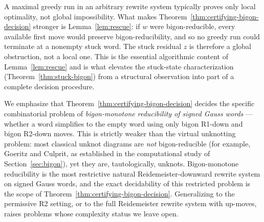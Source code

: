 \begin{remark}\label{rem:why-residual-is-cert}
A maximal greedy run in an arbitrary rewrite system typically proves
only local optimality, not global impossibility. What makes
Theorem~\ref{thm:certifying-bigon-decision} stronger is
Lemma~\ref{lem:rescue}: if $w$ were bigon-reducible, every available
first move would preserve bigon-reducibility, and so no greedy run
could terminate at a nonempty stuck word. The stuck residual $z$ is
therefore a global obstruction, not a local one. This is the essential
algorithmic content of Lemma~\ref{lem:rescue} and is what elevates
the stuck-state characterization
(Theorem~\ref{thm:stuck-bigon}) from a structural observation into
part of a complete decision procedure.
\end{remark}

\begin{remark}
\label{rem:scope-bigon-vs-unknotting}
We emphasize that Theorem~\ref{thm:certifying-bigon-decision} decides
the specific combinatorial problem of \emph{bigon-monotone
reducibility of signed Gauss words} — whether a word simplifies to
the empty word using only bigon R1-down and bigon R2-down moves. This
is strictly weaker than the virtual unknotting problem: most classical
unknot diagrams are \emph{not} bigon-reducible (for example,
Goeritz and Culprit, as established in the computational study of
Section~\ref{sec:bigon}), yet they are, tautologically, unknots.
Bigon-monotone reducibility is the most restrictive natural
Reidemeister-downward rewrite system on signed Gauss words, and the
exact decidability of this restricted problem is the scope of
Theorem~\ref{thm:certifying-bigon-decision}. Generalizing to the
permissive R2 setting, or to the full Reidemeister rewrite system
with up-moves, raises problems whose complexity status we leave open.
\end{remark}
